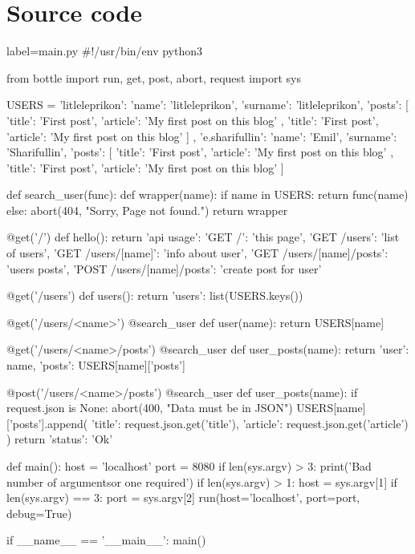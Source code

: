 \documentclass[a4paper,11pt]{article}
\begin{document}
\section{Source code}
\begin{pythoncode*}{label=main.py}
#!/usr/bin/env python3

from bottle import run, get, post, abort, request
import sys

USERS = {
    'litleleprikon': {
        'name': 'litleleprikon',
        'surname': 'litleleprikon',
        'posts': [
            {
                'title': 'First post',
                'article': 'My first post on this blog'
            },
            {
                'title': 'First post',
                'article': 'My first post on this blog'
            }
        ]
    },
    'e.sharifullin': {
        'name': 'Emil',
        'surname': 'Sharifullin',
        'posts': [
            {
                'title': 'First post',
                'article': 'My first post on this blog'
            },
            {
                'title': 'First post',
                'article': 'My first post on this blog'
            }
        ]
    }
}

def search_user(func):
    def wrapper(name):
        if name in USERS:
            return func(name)
        else:
            abort(404, "Sorry, Page not found.")
    return wrapper


@get('/')
def hello():
    return {
        'api usage': {
            'GET /': 'this page',
            'GET /users': 'list of users',
            'GET /users/[name]': 'info about user',
            'GET /users/[name]/posts': 'users posts',
            'POST /users/[name]/posts': 'create post for user'
        }
    }

@get('/users')
def users():
    return {'users': list(USERS.keys())}

@get('/users/<name>')
@search_user
def user(name):
    return USERS[name]


@get('/users/<name>/posts')
@search_user
def user_posts(name):
    return {
            'user': name,
            'posts': USERS[name]['posts']
        }


@post('/users/<name>/posts')
@search_user
def user_posts(name):
    if request.json is None:
        abort(400, "Data must be in JSON")
    USERS[name]['posts'].append({
            'title': request.json.get('title'),
            'article': request.json.get('article')
        })
    return {'status': 'Ok'}


def main():
    host = 'localhost'
    port = 8080
    if len(sys.argv) > 3:
        print('Bad number of arguments\nZero or one required')
    if len(sys.argv) > 1:
        host = sys.argv[1]
    if len(sys.argv) == 3:
        port = sys.argv[2]
    run(host='localhost', port=port, debug=True)

if __name__ == '__main__':
    main()

\end{pythoncode*}
\end{document}
